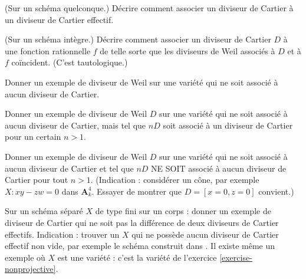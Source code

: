 \begin{exercise}
\label{exercise-effective-cartier-cartier}
(Sur un schéma quelconque.)
Décrire comment associer un diviseur de Cartier à un diviseur de Cartier effectif.
\end{exercise}

\begin{exercise}
\label{exercise-rational-function-cartier}
(Sur un schéma intègre.)
Décrire comment associer un diviseur de Cartier $D$ à une fonction rationnelle
$f$ de telle sorte que les diviseurs de Weil associés à $D$ et à $f$ coïncident.
(C'est tautologique.)
\end{exercise}

\begin{exercise}
\label{exercise-weil-not-cartier}
Donner un exemple de diviseur de Weil sur une variété qui ne soit
associé à aucun diviseur de Cartier.
\end{exercise}

\begin{exercise}
\label{exercise-weil-Q-cartier}
Donner un exemple de diviseur de Weil $D$ sur une variété qui ne soit
associé à aucun diviseur de Cartier, mais
tel que $nD$ soit associé à un diviseur de Cartier
pour un certain $n > 1$.
\end{exercise}

\begin{exercise}
\label{exercise-weil-not-Q-cartier}
Donner un exemple de diviseur de Weil $D$ sur une variété qui ne soit
associé à aucun diviseur de Cartier et
tel que $nD$ NE SOIT associé à aucun diviseur de Cartier
pour tout $n > 1$.
(Indication : considérer un cône, par exemple $X : xy - zw = 0$ dans
$\mathbf{A}^4_k$. Essayer de montrer que $D = [x = 0, z = 0]$ convient.)
\end{exercise}

\begin{exercise}
\label{exercise-cartier-not-difference-effective-cartier}
Sur un schéma séparé $X$ de type fini sur un corps :
donner un exemple de diviseur de Cartier qui ne soit pas la différence de
deux diviseurs de Cartier effectifs.
Indication : trouver un $X$ qui ne possède aucun diviseur de Cartier effectif non vide,
par exemple le schéma construit dans
\cite[III, exercice 5.9]{H}. Il existe même un exemple
où $X$ est une variété : c'est la variété de
l'exercice \ref{exercise-nonprojective}.
\end{exercise}


